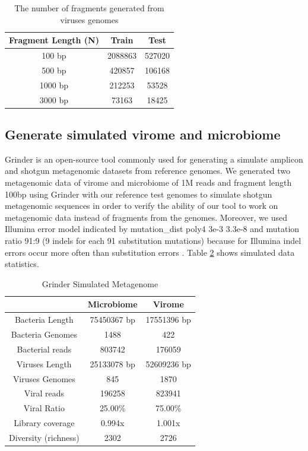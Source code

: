 \documentclass[conference]{IEEEtran}
\begin{document}
\begin{table}[h!]
	\centering
	\begin{tabular}{||c c c||} 
		Fragment Length (N) & Train & Test \\ [0.5ex] 
		\hline\hline
		100 bp & 2088863  & 527020  \\ 
		500 bp & 420857  & 106168  \\
		1000 bp & 212253  & 53528  \\
		3000 bp & 73163  & 18425  \\ [1ex] 
	\end{tabular}
	\caption{The number of fragments generated from viruses genomes}
	\label{table:fragments_stats}
\end{table}

\subsection{Generate simulated virome and microbiome}
Grinder \cite{angly2012grinder} is an open-source tool commonly used for generating a simulate amplicon and shotgun metagenomic datasets from reference genomes. 
We generated two metagenomic data of virome and microbiome of 1M reads and fragment length 100bp using Grinder with our reference test genomes to simulate shotgun metagenomic sequences in order to verify the ability of our tool to work on metagenomic data instead of fragments from the genomes. Moreover, we used Illumina error model indicated by mutation\_dist poly4 3e-3 3.3e-8 and mutation ratio 91:9 (9 indels for each 91 substitution mutations) because for Illumina indel errors occur more often than substitution errors \cite{laehnemann2015denoising}. Table \ref{table:simulate_stats} shows simulated data statistics.  \\

\begin{table}[h!]
	\centering
	\begin{tabular}{||c c c||} 
		& Microbiome & Virome \\ [0.5ex] 
		\hline\hline
		Bacteria Length & 75450367  bp  & 17551396 bp  \\
		Bacteria Genomes & 1488 & 422\\
		Bacterial reads & 803742 & 176059\\
		Viruses Length & 25133078 bp  & 52609236 bp  \\ 
		Viruses Genomes & 845 & 1870\\
		Viral reads & 196258 & 823941 \\  
		Viral Ratio & 25.00\% & 75.00\% \\ 
		Library coverage &  0.994x &  1.001x  \\
		Diversity (richness) & 2302 & 2726 \\ [1ex]
	\end{tabular}
	\caption{Grinder Simulated Metagenome}
	\label{table:simulate_stats}
\end{table}
\end{document}
